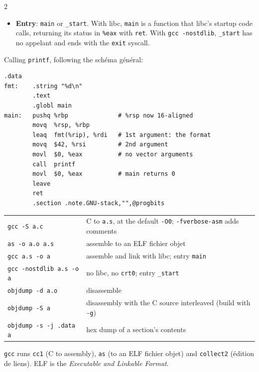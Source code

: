 \begin{multicols}{2}
\begin{itemize}[nosep, leftmargin=10pt]
  \item {} \textbf{Entry}: \texttt{main} or \texttt{\_start}. With libc, \texttt{main} is a
    function that libc's startup code calls, returning its status in
    \texttt{\%eax} with \texttt{ret}. With \mbox{\texttt{gcc -nostdlib}}, \texttt{\_start}
    has no appelant and ends with the \texttt{exit} syscall.
\end{itemize}
\medskip\noindent\begin{minipage}[t]{\linewidth}
Calling \texttt{printf}, following the schéma général:
\begin{lstlisting}[language=gas, xleftmargin=0pt]
        .data
fmt:    .string "%d\n"
        .text
        .globl main
main:   pushq %rbp              # %rsp now 16-aligned
        movq  %rsp, %rbp
        leaq  fmt(%rip), %rdi   # 1st argument: the format
        movq  $42, %rsi         # 2nd argument
        movl  $0, %eax          # no vector arguments
        call  printf
        movl  $0, %eax          # main returns 0
        leave
        ret
        .section .note.GNU-stack,"",@progbits
\end{lstlisting}
\end{minipage}

\begin{tabularx}{\linewidth}{@{}lX@{}}
\texttt{gcc -S a.c} & C to \texttt{a.s}, at the default \texttt{-O0}; \texttt{-fverbose-asm} adds comments \\
\texttt{as -o a.o a.s} & assemble to an ELF fichier objet \\
\texttt{gcc a.s -o a} & assemble and link with libc; entry \texttt{main} \\
\texttt{gcc -nostdlib a.s -o a} & no libc, no \texttt{crt0}; entry \texttt{\_start} \\
\texttt{objdump -d a.o} & disassemble \\
\texttt{objdump -S a} & disassembly with the C source interleaved (build with \texttt{-g}) \\
\texttt{objdump -s -j .data a} & hex dump of a section's contents \\
\end{tabularx}\par\smallskip
\texttt{gcc} runs \texttt{cc1} (C to assembly), \texttt{as} (to an ELF fichier objet) and
\texttt{collect2} (édition de liens). ELF is the \textit{Executable and Linkable Format}.
\end{multicols}
\endgroup

\clearpage
\restoregeometry
\setlength{\headwidth}{\textwidth}
